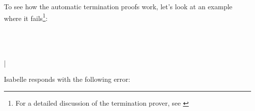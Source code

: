 \begin{isabellebody}
\endisatagproof
{\isafoldproof}%
%
\isadelimproof
%
\endisadelimproof
%
\isamarkuptrue%
%
\begin{isamarkuptext}%
To see how the automatic termination proofs work, let's look at an
  example where it fails\footnote{For a detailed discussion of the
  termination prover, see \cite{bulwahnKN07}}:

\end{isamarkuptext}  
 \\%
\\%
\hspace*{2ex}\\%
|\hspace*{1.5ex}\\
\begin{isamarkuptext}

\noindent Isabelle responds with the following error:


\end{isamarkuptext}
\end{isabellebody}

